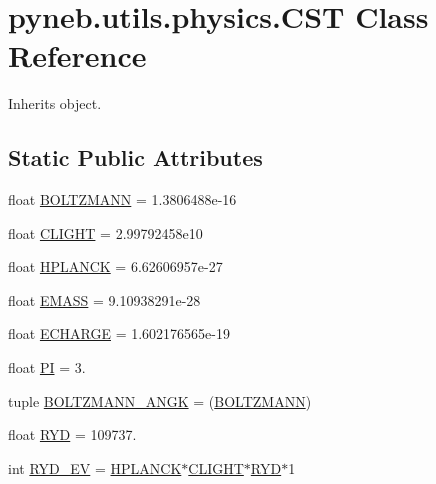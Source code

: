 \hypertarget{classpyneb_1_1utils_1_1physics_1_1_c_s_t}{\section{pyneb.\-utils.\-physics.\-C\-S\-T Class Reference}
\label{classpyneb_1_1utils_1_1physics_1_1_c_s_t}
}


Inherits object.

\subsection*{Static Public Attributes}
\begin{DoxyCompactItemize}
\item 
float \hyperlink{classpyneb_1_1utils_1_1physics_1_1_c_s_t_aee0d21a1f9edd72e75c5369bd5bc36b9}{B\-O\-L\-T\-Z\-M\-A\-N\-N} = 1.\-3806488e-\/16
\item 
float \hyperlink{classpyneb_1_1utils_1_1physics_1_1_c_s_t_a316a5d8a7c983441bd40589f040f3a09}{C\-L\-I\-G\-H\-T} = 2.\-99792458e10
\item 
float \hyperlink{classpyneb_1_1utils_1_1physics_1_1_c_s_t_a00251eede3f56eadeb766c97f3144c55}{H\-P\-L\-A\-N\-C\-K} = 6.\-62606957e-\/27
\item 
float \hyperlink{classpyneb_1_1utils_1_1physics_1_1_c_s_t_a0131d55ea22f1ecb699a8d5dcf18e62e}{E\-M\-A\-S\-S} = 9.\-10938291e-\/28
\item 
float \hyperlink{classpyneb_1_1utils_1_1physics_1_1_c_s_t_affe8f9c45db60b472fb1779b6e88c43b}{E\-C\-H\-A\-R\-G\-E} = 1.\-602176565e-\/19
\item 
float \hyperlink{classpyneb_1_1utils_1_1physics_1_1_c_s_t_adeb7151ce462944ff7a0ff2803f873c3}{P\-I} = 3.
\item 
tuple \hyperlink{classpyneb_1_1utils_1_1physics_1_1_c_s_t_a7c0a4476149f179955c86bfdb63ade78}{B\-O\-L\-T\-Z\-M\-A\-N\-N\-\_\-\-A\-N\-G\-K} = (\hyperlink{classpyneb_1_1utils_1_1physics_1_1_c_s_t_aee0d21a1f9edd72e75c5369bd5bc36b9}{B\-O\-L\-T\-Z\-M\-A\-N\-N})
\item 
float \hyperlink{classpyneb_1_1utils_1_1physics_1_1_c_s_t_a468e4f9fac1fbd71b5ca458a84ae05cc}{R\-Y\-D} = 109737.
\item 
int \hyperlink{classpyneb_1_1utils_1_1physics_1_1_c_s_t_a337f87b4676ea337149e177d81b481e1}{R\-Y\-D\-\_\-\-E\-V} = \hyperlink{classpyneb_1_1utils_1_1physics_1_1_c_s_t_a00251eede3f56eadeb766c97f3144c55}{H\-P\-L\-A\-N\-C\-K}$\ast$\hyperlink{classpyneb_1_1utils_1_1physics_1_1_c_s_t_a316a5d8a7c983441bd40589f040f3a09}{C\-L\-I\-G\-H\-T}$\ast$\hyperlink{classpyneb_1_1utils_1_1physics_1_1_c_s_t_a468e4f9fac1fbd71b5ca458a84ae05cc}{R\-Y\-D}$\ast$1

\end{DoxyCompactItemize}
